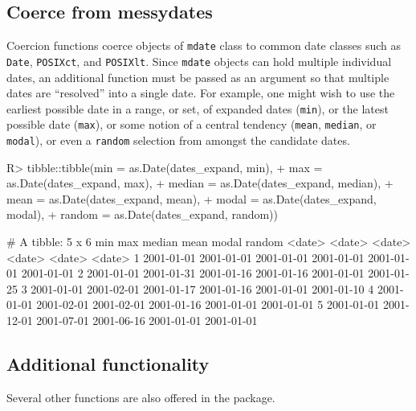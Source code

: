\documentclass[
]{jss}
\begin{document}
\hypertarget{coerce-from-messydates}{%
\subsection{Coerce from messydates}\label{coerce-from-messydates}}

Coercion functions coerce objects of \texttt{mdate} class to common date
classes such as \texttt{Date}, \texttt{POSIXct}, and \texttt{POSIXlt}.
Since \texttt{mdate} objects can hold multiple individual dates, an
additional function must be passed as an argument so that multiple dates
are ``resolved'' into a single date. For example, one might wish to use
the earliest possible date in a range, or set, of expanded dates
(\texttt{min}), or the latest possible date (\texttt{max}), or some
notion of a central tendency (\texttt{mean}, \texttt{median}, or
\texttt{modal}), or even a \texttt{random} selection from amongst the
candidate dates.

\begin{CodeChunk}
\begin{CodeInput}
R> tibble::tibble(min = as.Date(dates_expand, min),
+                max = as.Date(dates_expand, max),
+                median = as.Date(dates_expand, median),
+                mean = as.Date(dates_expand, mean),
+                modal = as.Date(dates_expand, modal),
+                random = as.Date(dates_expand, random))
\end{CodeInput}
\begin{CodeOutput}
# A tibble: 5 x 6
  min        max        median     mean       modal      random    
  <date>     <date>     <date>     <date>     <date>     <date>    
1 2001-01-01 2001-01-01 2001-01-01 2001-01-01 2001-01-01 2001-01-01
2 2001-01-01 2001-01-31 2001-01-16 2001-01-16 2001-01-01 2001-01-25
3 2001-01-01 2001-02-01 2001-01-17 2001-01-16 2001-01-01 2001-01-10
4 2001-01-01 2001-02-01 2001-02-01 2001-01-16 2001-01-01 2001-01-01
5 2001-01-01 2001-12-01 2001-07-01 2001-06-16 2001-01-01 2001-01-01
\end{CodeOutput}
\end{CodeChunk}

\hypertarget{additional-functionality}{%
\subsection{Additional functionality}\label{additional-functionality}}

Several other functions are also offered in the 
package.
\end{document}
